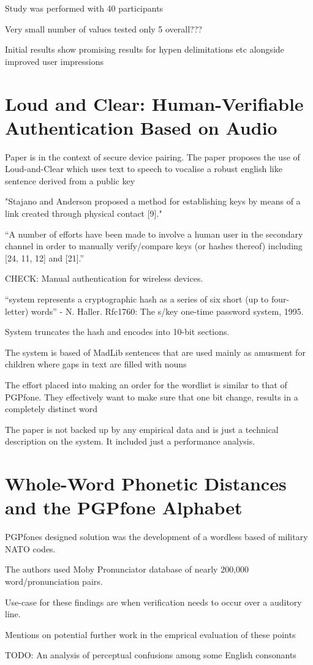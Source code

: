 Study was performed with 40 participants

Very small number of values tested only 5 overall???

Initial results show promising results for hypen delimitations etc alongside improved user impressions


\newpage

\section{Loud and Clear: Human-Verifiable Authentication Based on Audio}

Paper is in the context of secure device pairing. The paper proposes the use of Loud-and-Clear which uses text to speech to vocalise a robust english like sentence derived from a public key


"Stajano and Anderson proposed a method
for establishing keys by means of a link created through physical contact [9]."

``A number of efforts have been made to involve a human user in the secondary channel in order to manually verify/compare
keys (or hashes thereof) including [24, 11, 12] and [21].''

CHECK: Manual authentication for wireless devices.

``system represents a cryptographic hash as a series of six short (up to four-
letter) words'' - N. Haller. Rfc1760: The s/key one-time password system, 1995.

System truncates the hash and encodes into 10-bit sections.

The system is based of MadLib sentences that are used mainly as amusment for children where gaps in text are filled with nouns

The effort placed into making an order for the wordlist is similar to that of PGPfone. They effectively want to make sure that one bit change, results in a completely distinct word

The paper is not backed up by any empirical data and is just a technical description on the system. It included just a performance analysis.

\newpage

\section{Whole-Word Phonetic Distances and the PGPfone Alphabet}

PGPfones designed solution was the development of a wordless based of military NATO codes.

The authors used Moby Pronunciator database of nearly 200,000 word/pronunciation pairs.

Use-case for these findings are when verification needs to occur over a auditory line.

Mentions on potential further work in the emprical evaluation of these points


TODO: An analysis of perceptual confusions among some English consonants